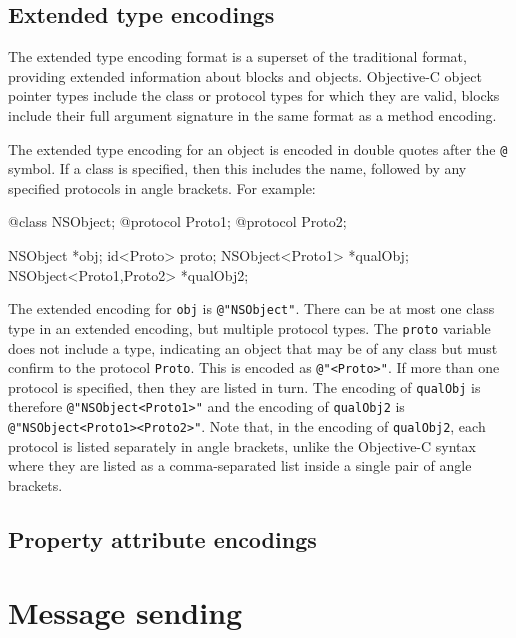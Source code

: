 \documentclass[a4paper]{report}
\newcommand{\objc}[1]{\lstinline[language={[Objective]C}]{#1}}
\begin{document}
\section{Extended type encodings}

The extended type encoding format is a superset of the traditional format, providing extended information about blocks and objects.
Objective-C object pointer types include the class or protocol types for which they are valid, blocks include their full argument signature in the same format as a method encoding.

The extended type encoding for an object is encoded in double quotes after the \texttt{@} symbol.
If a class is specified, then this includes the name, followed by any specified protocols in angle brackets.
For example:

\begin{codesnippet}
@class NSObject;
@protocol Proto1;
@protocol Proto2;

NSObject *obj;
id<Proto> proto;
NSObject<Proto1> *qualObj;
NSObject<Proto1,Proto2> *qualObj2;
\end{codesnippet}

The extended encoding for \objc{obj} is \texttt{@"NSObject"}.
There can be at most one class type in an extended encoding, but multiple protocol types.
The \objc{proto} variable does not include a type, indicating an object that may be of any class but must confirm to the protocol \objc{Proto}.
This is encoded as \texttt{@"<Proto>"}.
If more than one protocol is specified, then they are listed in turn.
The encoding of \objc{qualObj} is therefore \texttt{@"NSObject<Proto1>"} and the encoding of \objc{qualObj2} is \texttt{@"NSObject<Proto1><Proto2>"}.
Note that, in the encoding of \objc{qualObj2}, each protocol is listed separately in angle brackets, unlike the Objective-C syntax where they are listed as a comma-separated list inside a single pair of angle brackets.

\section{Property attribute encodings}



\chapter{Message sending}
\end{document}
